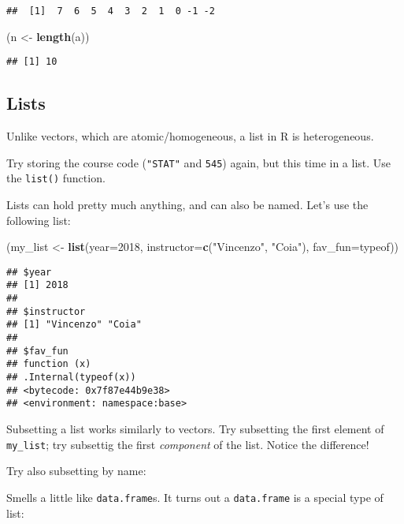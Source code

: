 \documentclass[]{article}
\newenvironment{Shaded}{\begin{snugshade}}{\end{snugshade}}
\newcommand{\KeywordTok}[1]{\textcolor[rgb]{0.13,0.29,0.53}{\textbf{#1}}}
\newcommand{\DataTypeTok}[1]{\textcolor[rgb]{0.13,0.29,0.53}{#1}}
\newcommand{\DecValTok}[1]{\textcolor[rgb]{0.00,0.00,0.81}{#1}}
\newcommand{\StringTok}[1]{\textcolor[rgb]{0.31,0.60,0.02}{#1}}
\newcommand{\NormalTok}[1]{#1}
\begin{document}
\begin{verbatim}
##  [1]  7  6  5  4  3  2  1  0 -1 -2
\end{verbatim}

\begin{Shaded}
\begin{Highlighting}[]
\NormalTok{(n <-}\StringTok{ }\KeywordTok{length}\NormalTok{(a))}
\end{Highlighting}
\end{Shaded}

\begin{verbatim}
## [1] 10
\end{verbatim}

\subsection{Lists}\label{lists}

Unlike vectors, which are atomic/homogeneous, a list in R is
heterogeneous.

Try storing the course code (\texttt{"STAT"} and \texttt{545}) again,
but this time in a list. Use the \texttt{list()} function.

Lists can hold pretty much anything, and can also be named. Let's use
the following list:

\begin{Shaded}
\begin{Highlighting}[]
\NormalTok{(my_list <-}\StringTok{ }\KeywordTok{list}\NormalTok{(}\DataTypeTok{year=}\DecValTok{2018}\NormalTok{, }\DataTypeTok{instructor=}\KeywordTok{c}\NormalTok{(}\StringTok{"Vincenzo"}\NormalTok{, }\StringTok{"Coia"}\NormalTok{), }\DataTypeTok{fav_fun=}\NormalTok{typeof))}
\end{Highlighting}
\end{Shaded}

\begin{verbatim}
## $year
## [1] 2018
## 
## $instructor
## [1] "Vincenzo" "Coia"    
## 
## $fav_fun
## function (x) 
## .Internal(typeof(x))
## <bytecode: 0x7f87e44b9e38>
## <environment: namespace:base>
\end{verbatim}

Subsetting a list works similarly to vectors. Try subsetting the first
element of \texttt{my\_list}; try subsettig the first \emph{component}
of the list. Notice the difference!

Try also subsetting by name:

Smells a little like \texttt{data.frame}s. It turns out a
\texttt{data.frame} is a special type of list:
\end{document}
